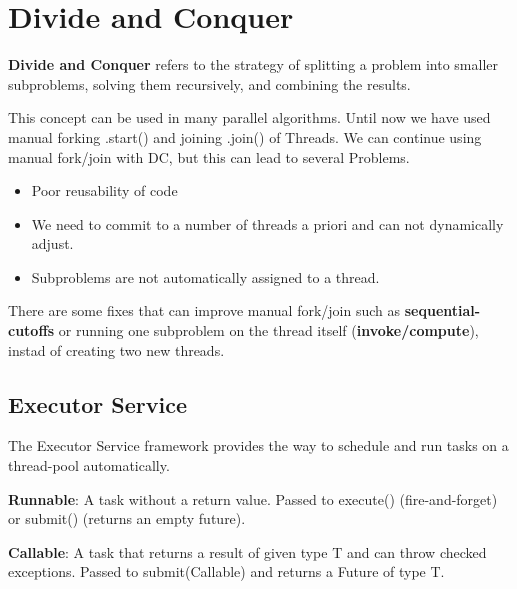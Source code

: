 \section{Divide and Conquer}

\begin{definition}
    \textbf{Divide and Conquer } refers to the strategy of splitting a problem into smaller subproblems, solving them recursively, and combining the results.
\end{definition}

This concept can be used in many parallel algorithms. Until now we have used manual forking .start() and joining .join() of Threads. We can continue using manual fork/join with DC, but this can lead to several Problems.

\begin{itemize}
    \item Poor reusability of code
    \item We need to commit to a number of threads a priori and can not dynamically adjust.
    \item Subproblems are not automatically assigned to a thread.
\end{itemize}

\begin{remark}
    There are some fixes that can improve manual fork/join such as \textbf{sequential-cutoffs} or running one subproblem on the thread itself (\textbf{invoke/compute}), instad of creating two new threads.
\end{remark}

\subsection{Executor Service}

The Executor Service framework provides the way to schedule and run tasks on a thread-pool automatically.

\begin{definition}
    \textbf{Runnable}: A task without a return value. Passed to execute() (fire-and-forget) or submit() (returns an empty future).
\end{definition}

\begin{definition}
    \textbf{Callable}: A task that returns a result of given type T and can throw checked exceptions. Passed to submit(Callable) and returns a Future of type T.
\end{definition}

